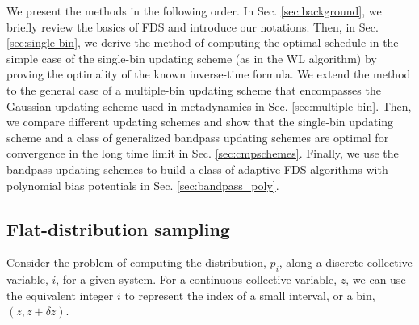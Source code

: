 \documentclass[preprint, superscriptaddress, floatfix]{revtex4-1}
\begin{document}
We present the methods
in the following order.
%
In Sec. \ref{sec:background},
we briefly review the basics of FDS
and introduce our notations.
%
Then, in Sec. \ref{sec:single-bin},
we derive the method of
computing the optimal schedule
in the simple case of the
single-bin updating scheme
(as in the WL algorithm)
by proving the optimality
of the known inverse-time formula.
%
We extend the method to the general case
of a multiple-bin updating scheme
that encompasses the Gaussian updating scheme used in metadynamics
in Sec. \ref{sec:multiple-bin}.
%
Then, we compare different updating schemes
and show that the single-bin updating scheme
and a class of generalized bandpass updating schemes
are optimal for convergence
in the long time limit
in Sec. \ref{sec:cmpschemes}.
%
Finally,
we use the bandpass updating schemes
to build a class of adaptive FDS algorithms
with polynomial bias potentials
in Sec. \ref{sec:bandpass_poly}.



\subsection{\label{sec:background}
Flat-distribution sampling}






Consider the problem of computing
the distribution, $p_i$,
along a discrete collective variable, $i$,
for a given system.
%
%
For a continuous collective variable, $z$,
we can use the equivalent integer $i$ to represent
the index of a small interval, or a bin,
$(z, z + \delta z)$.
%
\end{document}
